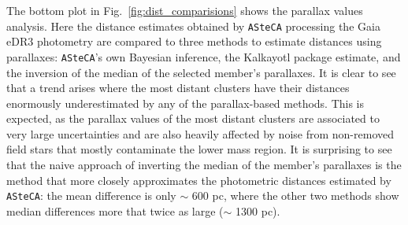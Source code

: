 \documentclass[draft]{aa}
\begin{document}
  The bottom plot in Fig.~\ref{fig:dist_comparisions} shows the parallax values
  analysis. Here the distance estimates obtained by \texttt{ASteCA} processing
  the Gaia eDR3 photometry are compared to three methods to estimate distances
  using parallaxes: \texttt{ASteCA}'s own Bayesian inference, the Kalkayotl
  package estimate, and the inversion of the median of the selected member's
  parallaxes. It is clear to see that a trend arises where the most distant
  clusters have their distances enormously underestimated by any of the
  parallax-based methods. This is expected, as the parallax values of the most
  distant clusters are associated to very large uncertainties and are also
  heavily affected by noise from non-removed field stars that mostly contaminate
  the lower mass region.
  It is surprising to see that the naive approach of inverting the median of
  the member's parallaxes is the method that more closely approximates the
  photometric distances estimated by \texttt{ASteCA}: the mean difference is
  only $\sim$ 600 pc, where the other two methods show median differences more
  that twice as large ($\sim$ 1300 pc).
  \\
\end{document}
